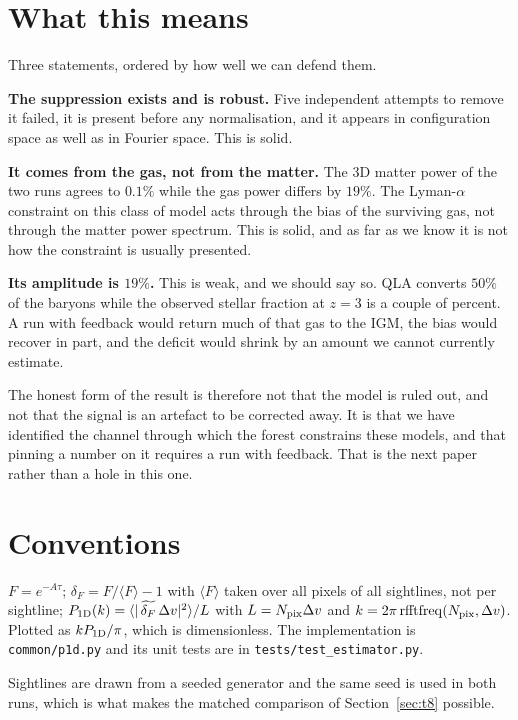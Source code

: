 \documentclass[11pt,a4paper]{article}
\newcommand{\Pod}{\ensuremath{P_{\rm 1D}}}
\newcommand{\code}[1]{\texttt{\small #1}}
\begin{document}
\section{What this means}

Three statements, ordered by how well we can defend them.

\textbf{The suppression exists and is robust.} Five independent attempts to
remove it failed, it is present before any normalisation, and it appears in
configuration space as well as in Fourier space. This is solid.

\textbf{It comes from the gas, not from the matter.} The 3D matter power of
the two runs agrees to $0.1\%$ while the gas power differs by $19\%$. The
Lyman-$\alpha$ constraint on this class of model acts through the bias of
the surviving gas, not through the matter power spectrum. This is solid,
and as far as we know it is not how the constraint is usually presented.

\textbf{Its amplitude is $19\%$.} This is weak, and we should say so. QLA
converts $50\%$ of the baryons while the observed stellar fraction at $z=3$
is a couple of percent. A run with feedback would return much of that gas
to the IGM, the bias would recover in part, and the deficit would shrink by
an amount we cannot currently estimate.

The honest form of the result is therefore not that the model is ruled out,
and not that the signal is an artefact to be corrected away. It is that we
have identified the channel through which the forest constrains these
models, and that pinning a number on it requires a run with feedback. That
is the next paper rather than a hole in this one.

\appendix

\section{Conventions}

$F = e^{-A\tau}$; $\delta_F = F/\langle F\rangle - 1$ with
$\langle F\rangle$ taken over all pixels of all sightlines, not per
sightline;
$\Pod(k) = \langle |\,\widetilde{\delta_F}\,\Delta v|^2\rangle / L$ with
$L = N_{\rm pix}\Delta v$ and $k = 2\pi\,\mathrm{rfftfreq}(N_{\rm pix},
\Delta v)$. Plotted as $k\Pod/\pi$, which is dimensionless. The
implementation is \code{common/p1d.py} and its unit tests are in
\code{tests/test\_estimator.py}.

Sightlines are drawn from a seeded generator and the same seed is used in
both runs, which is what makes the matched comparison of
Section~\ref{sec:t8} possible.
\end{document}
